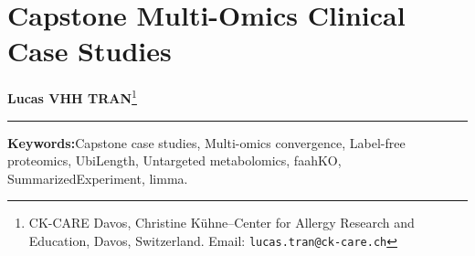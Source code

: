 \documentclass[11pt,twoside,openright]{book}
\begin{document}
\setcounter{chapter}{30}
\chapter{Capstone Multi-Omics Clinical Case Studies}
\label{chap:capstone_case_studies}

\noindent
\textbf{Lucas VHH TRAN}\footnote{CK-CARE Davos, Christine K\"uhne--Center for Allergy Research and Education, Davos, Switzerland. Email: \texttt{lucas.tran@ck-care.ch}}\\
\rule{\textwidth}{0.8pt}

\begin{abstract}
\noindent
Proteomics and metabolomics represent distinct biochemical disciplines that converge upon a unified computational grammar in R and Bioconductor. At the raw instrument tier, proteomics relies on peptide-spectrum match (PSM) directed acyclic graphs (\texttt{QFeatures}) \cite{gatto2023qfeatures}, whereas metabolomics requires continuous wavelet peak picking and non-linear chromatographic alignment (\texttt{xcms}) \cite{smith2006xcms, tautenhahn2008centwave}. However, once raw spectra are converted into 2D feature-by-sample matrices, both disciplines converge upon the identical coordinate-invariant container: \texttt{SummarizedExperiment} \cite{huber2015orchestrating}. Downstream normalization (variance-stabilizing transformation or median centering) \cite{huber2002vsn}, missing-data imputation (MinProb or gap filling) \cite{lazar2016accounting, benton2015evaluating}, empirical Bayes linear modeling (\texttt{limma}) \cite{smyth2004limma, ritchie2015limma}, false discovery rate (FDR) control \cite{benjamini1995controlling}, and FAIR metadata deposition execute using identical syntax \cite{wilkinson2016fair}. This capstone chapter synthesizes the preceding thirty chapters into two end-to-end case studies executed on real benchmark cohorts: a label-free quantitative proteomics study of ubiquitin pathway disruption in HeLa cells (\texttt{DEP::UbiLength}) \cite{zhang2017ubilength, zhang2018dep}, and an untargeted metabolomics study of fatty-acid amide accumulation in knockout mice (\texttt{faahKO}) \cite{cravatt2001faah, saghatelian2004activity} in R 4.6.1.
\end{abstract}

\vspace{1em}
\noindent\textbf{Keywords:}\enspace Capstone case studies, Multi-omics convergence, Label-free proteomics, UbiLength, Untargeted metabolomics, faahKO, SummarizedExperiment, limma.
\end{document}

